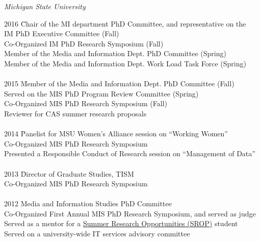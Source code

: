 \documentclass[9pt]{extarticle}
\begin{document}
\emph{Michigan State University} \\
\vspace{1pt}
\begin{tabbing}
2016 \hspace{0.3in}\= Chair of the MI department PhD Committee, and representative on the \\
\> \hspace{0.5cm} IM PhD Executive Committee (Fall) \\
\> Co-Organized IM PhD Research Symposium (Fall) \\ %
\> Member of the Media and Information Dept. PhD Committee (Spring) \\ 
\> Member of the Media and Information Dept. Work Load Task Force (Spring) \\\\

2015 \hspace{0.3in}\=  Member of the Media and Information Dept. PhD Committee (Fall) \\ %
\> Served on the MIS PhD Program Review Committee (Spring) \\ %
\> Co-Organized MIS PhD Research Symposium (Fall) \\ %
\> Reviewer for CAS summer research proposals \\\\ %

2014 \hspace{0.3in}\=  Panelist for MSU Women's Alliance session on ``Working Women'' \\ %
\> Co-Organized MIS PhD Research Symposium \\ %
\> Presented a Responsible Conduct of Research session on ``Management of Data'' \\\\ %

2013 \hspace{0.3in}\=  Director of Graduate Studies, TISM \\
\> Co-Organized MIS PhD Research Symposium \\\\ %

2012 \>  Media and Information Studies PhD Committee \\
\> Co-Organized First Annual MIS PhD Research Symposium, and served as judge \\ %
\> Served as a mentor for a \href{https://grad.msu.edu/srop}{Summer Research Opportunities (SROP)} student \\ %
\> Served on a university-wide IT services advisory committee %
\end{tabbing}
\end{document}
